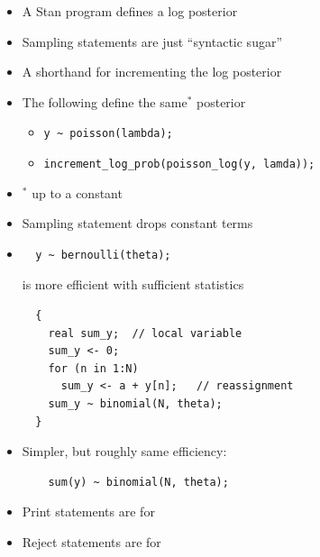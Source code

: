 \documentclass[10pt]{report}
\begin{document}
\begin{itemize}
\item A Stan program defines a log posterior
\item Sampling statements are just ``syntactic sugar''
\item A shorthand for incrementing the log posterior
\item The following define the same$^*$ posterior
\begin{itemize}
\item \Verb|y ~ poisson(lambda);|
\item \Verb|increment_log_prob(poisson_log(y, lamda));|
\end{itemize}
\item ${}^{*}$ up to a constant
\item Sampling statement drops constant terms
\end{itemize}

%
\begin{itemize}
\item 
\begin{Verbatim}
  y ~ bernoulli(theta);
\end{Verbatim}
is more efficient with sufficient statistics
{\small
\begin{Verbatim}
  {
    real sum_y;  // local variable
    sum_y <- 0;
    for (n in 1:N)
      sum_y <- a + y[n];   // reassignment
    sum_y ~ binomial(N, theta);
  }
\end{Verbatim}
}
\item Simpler, but roughly same efficiency:
\begin{Verbatim}
    sum(y) ~ binomial(N, theta);
\end{Verbatim}
\end{itemize}

\begin{itemize}
\item Print statements are for 
\item Reject statements are for 
\end{itemize}
\end{document}
